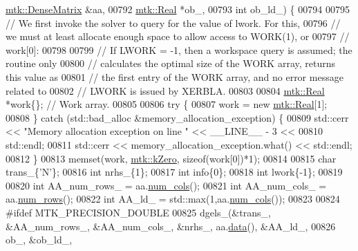 \begin{DoxyCode}
      \hyperlink{classmtk_1_1DenseMatrix}{mtk::DenseMatrix} &aa,
00792                                                    \hyperlink{group__c01-roots_gac080bbbf5cbb5502c9f00405f894857d}{mtk::Real} *ob\_,
00793                                                    \textcolor{keywordtype}{int} ob\_ld\_) \{
00794 
00795   \textcolor{comment}{// We first invoke the solver to query for the value of lwork. For this,}
00796   \textcolor{comment}{// we must at least allocate enough space to allow access to WORK(1), or}
00797   \textcolor{comment}{// work[0]:}
00798 
00799   \textcolor{comment}{// If LWORK = -1, then a workspace query is assumed; the routine only}
00800   \textcolor{comment}{// calculates the optimal size of the WORK array, returns this value as}
00801   \textcolor{comment}{// the first entry of the WORK array, and no error message related to}
00802   \textcolor{comment}{// LWORK is issued by XERBLA.}
00803 
00804   \hyperlink{group__c01-roots_gac080bbbf5cbb5502c9f00405f894857d}{mtk::Real} *work\{\}; \textcolor{comment}{// Work array.}
00805 
00806   \textcolor{keywordflow}{try} \{
00807     work = \textcolor{keyword}{new} \hyperlink{group__c01-roots_gac080bbbf5cbb5502c9f00405f894857d}{mtk::Real}[1];
00808   \} \textcolor{keywordflow}{catch} (std::bad\_alloc &memory\_allocation\_exception) \{
00809     std::cerr << \textcolor{stringliteral}{"Memory allocation exception on line "} << \_\_LINE\_\_ - 3 <<
00810       std::endl;
00811     std::cerr << memory\_allocation\_exception.what() << std::endl;
00812   \}
00813   memset(work, \hyperlink{group__c01-roots_ga59a451a5fae30d59649bcda274fea271}{mtk::kZero}, \textcolor{keyword}{sizeof}(work[0])*1);
00814 
00815   \textcolor{keywordtype}{char} trans\_\{\textcolor{charliteral}{'N'}\};
00816   \textcolor{keywordtype}{int} nrhs\_\{1\};
00817   \textcolor{keywordtype}{int} info\{0\};
00818   \textcolor{keywordtype}{int} lwork\{-1\};
00819 
00820   \textcolor{keywordtype}{int} AA\_num\_rows\_  = aa.\hyperlink{classmtk_1_1DenseMatrix_a41747502d468c6728a4be31501b16e0e}{num\_cols}();
00821   \textcolor{keywordtype}{int} AA\_num\_cols\_  = aa.\hyperlink{classmtk_1_1DenseMatrix_a53f3afb3b6a8d21854458aaa9663cc74}{num\_rows}();
00822   \textcolor{keywordtype}{int} AA\_ld\_ = std::max(1,aa.\hyperlink{classmtk_1_1DenseMatrix_a41747502d468c6728a4be31501b16e0e}{num\_cols}());
00823 
00824 \textcolor{preprocessor}{  #ifdef MTK\_PRECISION\_DOUBLE}
00825   dgels\_(&trans\_, &AA\_num\_rows\_, &AA\_num\_cols\_, &nrhs\_, aa.\hyperlink{classmtk_1_1DenseMatrix_a0c33b8a9e01d157c61ddbdf807c25d84}{data}(), &AA\_ld\_,
00826          ob\_, &ob\_ld\_,

\end{DoxyCode}
